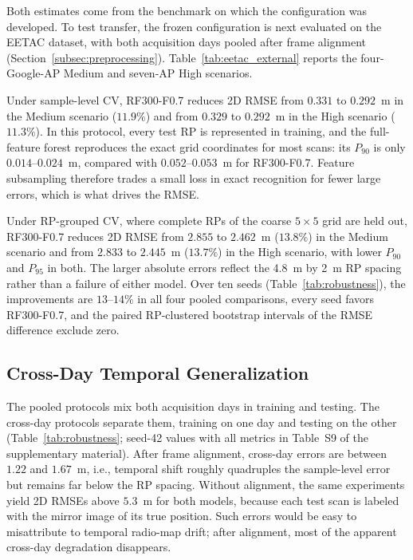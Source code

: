 Both estimates come from the benchmark on which the configuration was developed. To test transfer, the frozen configuration is next evaluated on the EETAC dataset, with both acquisition days pooled after frame alignment (Section~\ref{subsec:preprocessing}). Table~\ref{tab:eetac_external} reports the four-Google-AP Medium and seven-AP High scenarios.



Under sample-level CV, RF300-F0.7 reduces 2D RMSE from $0.331$ to $0.292$~m in the Medium scenario ($11.9\%$) and from $0.329$ to $0.292$~m in the High scenario ($11.3\%$). In this protocol, every test RP is represented in training, and the full-feature forest reproduces the exact grid coordinates for most scans: its $P_{90}$ is only $0.014$--$0.024$~m, compared with $0.052$--$0.053$~m for RF300-F0.7. Feature subsampling therefore trades a small loss in exact recognition for fewer large errors, which is what drives the RMSE.

Under RP-grouped CV, where complete RPs of the coarse $5\times5$ grid are held out, RF300-F0.7 reduces 2D RMSE from $2.855$ to $2.462$~m ($13.8\%$) in the Medium scenario and from $2.833$ to $2.445$~m ($13.7\%$) in the High scenario, with lower $P_{90}$ and $P_{95}$ in both. The larger absolute errors reflect the 4.8~m by 2~m RP spacing rather than a failure of either model. Over ten seeds (Table~\ref{tab:robustness}), the improvements are $13$--$14\%$ in all four pooled comparisons, every seed favors RF300-F0.7, and the paired RP-clustered bootstrap intervals of the RMSE difference exclude zero.

\subsection{Cross-Day Temporal Generalization}
\label{subsec:cross_day_results}

The pooled protocols mix both acquisition days in training and testing. The cross-day protocols separate them, training on one day and testing on the other (Table~\ref{tab:robustness}; seed-42 values with all metrics in Table~S9 of the supplementary material). After frame alignment, cross-day errors are between $1.22$ and $1.67$~m, i.e., temporal shift roughly quadruples the sample-level error but remains far below the RP spacing. Without alignment, the same experiments yield 2D RMSEs above $5.3$~m for both models, because each test scan is labeled with the mirror image of its true position. Such errors would be easy to misattribute to temporal radio-map drift; after alignment, most of the apparent cross-day degradation disappears.

